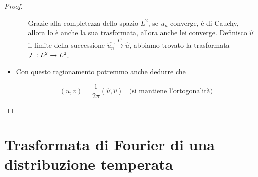 \begin{proof}
\begin{itemize}
\begin{itemize}
Grazie alla completezza dello spazio $L^{2}$, se $u_{n}$ converge, è di Cauchy, allora lo è anche la sua trasformata, allora anche lei converge. Definisco $\hat{u}$ il limite della successione $\widehat{u_{n}}\xrightarrow{L^{2}}\hat{u}$, abbiamo trovato la trasformata $\mathcal{F} : L^{2}\rightarrow L^{2}$.
\end{itemize}
\item Con questo ragionamento potremmo anche dedurre che

\begin{equation*}
(u, v) = \frac{1}{2\pi}(\hat{u}, \hat{v}) \ \ \ \ \text{(si mantiene l'ortogonalità)}
\end{equation*}
\end{itemize}
\end{proof}

\section{Trasformata di Fourier di una distribuzione temperata}

